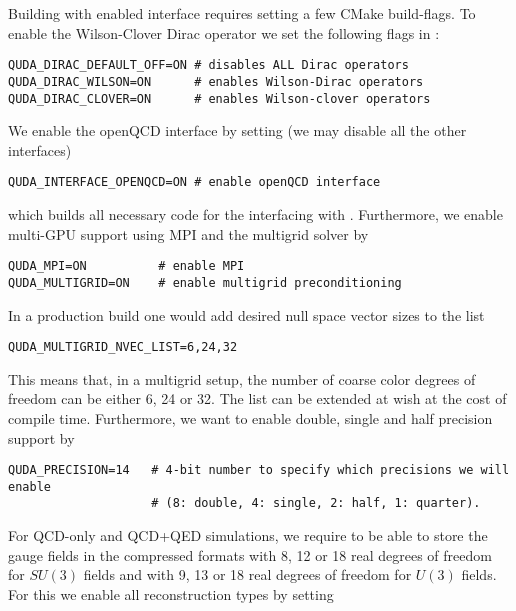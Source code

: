 
Building \quda with enabled \openqxd interface requires setting a few CMake build-flags.
To enable the Wilson-Clover Dirac operator we set the following flags in  \cite{QUDApaper}:
\begin{verbatim}
QUDA_DIRAC_DEFAULT_OFF=ON # disables ALL Dirac operators
QUDA_DIRAC_WILSON=ON      # enables Wilson-Dirac operators
QUDA_DIRAC_CLOVER=ON      # enables Wilson-clover operators
\end{verbatim}
We enable the openQCD interface by setting (we may disable all the other interfaces)
\begin{verbatim}
QUDA_INTERFACE_OPENQCD=ON # enable openQCD interface
\end{verbatim}
which builds all necessary code for the interfacing with \openqxd.
Furthermore, we enable multi-GPU support using MPI and the multigrid solver by
\begin{verbatim}
QUDA_MPI=ON          # enable MPI
QUDA_MULTIGRID=ON    # enable multigrid preconditioning
\end{verbatim}
In a production build one would add desired null space vector sizes to the list
\begin{verbatim}
QUDA_MULTIGRID_NVEC_LIST=6,24,32
\end{verbatim}
This means that, in a multigrid setup, the number of coarse color degrees of freedom can be either 6, 24 or 32.
The list can be extended at wish at the cost of compile time.
Furthermore, we want to enable double, single and half precision support by
\begin{verbatim}
QUDA_PRECISION=14   # 4-bit number to specify which precisions we will enable
                    # (8: double, 4: single, 2: half, 1: quarter).
\end{verbatim}
For QCD-only and QCD+QED simulations, we require \quda to be able to store the gauge fields in the compressed formats with 8, 12 or 18 real degrees of freedom for $SU(3)$ fields and with 9, 13 or 18 real degrees of freedom for $U(3)$ fields.
For this we enable all reconstruction types by setting
